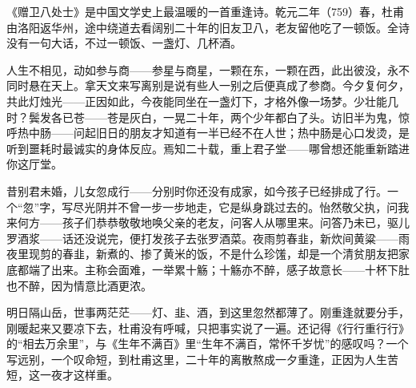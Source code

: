\begin{appreciation}
《赠卫八处士》是中国文学史上最温暖的一首重逢诗。乾元二年（759）春，杜甫由洛阳返华州，途中绕道去看阔别二十年的旧友卫八，老友留他吃了一顿饭。全诗没有一句大话，不过一顿饭、一盏灯、几杯酒。

人生不相见，动如参与商——参星与商星，一颗在东，一颗在西，此出彼没，永不同时悬在天上。拿天文来写离别是说有些人一别之后便真成了参商。今夕复何夕，共此灯烛光——正因如此，今夜能同坐在一盏灯下，才格外像一场梦。少壮能几时？鬓发各已苍——苍是灰白，一晃二十年，两个少年都白了头。访旧半为鬼，惊呼热中肠——问起旧日的朋友才知道有一半已经不在人世；热中肠是心口发烫，是听到噩耗时最诚实的身体反应。焉知二十载，重上君子堂——哪曾想还能重新踏进你这厅堂。

昔别君未婚，儿女忽成行——分别时你还没有成家，如今孩子已经排成了行。一个“忽”字，写尽光阴并不曾一步一步地走，它是纵身跳过去的。怡然敬父执，问我来何方——孩子们恭恭敬敬地唤父亲的老友，问客人从哪里来。问答乃未已，驱儿罗酒浆——话还没说完，便打发孩子去张罗酒菜。夜雨剪春韭，新炊间黄粱——雨夜里现剪的春韭，新煮的、掺了黄米的饭，不是什么珍馐，却是一个清贫朋友把家底都端了出来。主称会面难，一举累十觞；十觞亦不醉，感子故意长——十杯下肚也不醉，因为情意比酒更浓。

明日隔山岳，世事两茫茫——灯、韭、酒，到这里忽然都薄了。刚重逢就要分手，刚暖起来又要凉下去，杜甫没有呼喊，只把事实说了一遍。还记得《行行重行行》的“相去万余里”，与《生年不满百》里“生年不满百，常怀千岁忧”的感叹吗？一个写远别，一个叹命短，到杜甫这里，二十年的离散熬成一夕重逢，正因为人生苦短，这一夜才这样重。
\end{appreciation}
